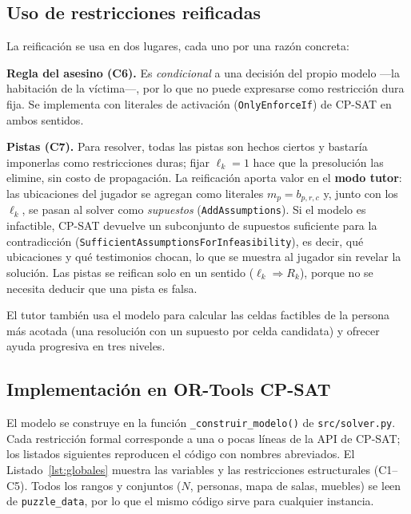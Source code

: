 \documentclass[conference,a4paper]{IEEEtran}
\begin{document}
\subsection{Uso de restricciones reificadas}\label{sec:reif}
La reificación se usa en dos lugares, cada uno por una razón concreta:

\textbf{Regla del asesino (C6).} Es \emph{condicional} a una decisión del propio modelo
---la habitación de la víctima---, por lo que no puede expresarse como restricción dura
fija. Se implementa con literales de activación (\texttt{OnlyEnforceIf}) de CP-SAT en
ambos sentidos.

\textbf{Pistas (C7).} Para resolver, todas las pistas son hechos ciertos y bastaría
imponerlas como restricciones duras; fijar $\ell_k=1$ hace que la presolución las elimine,
sin costo de propagación. La reificación aporta valor en el \textbf{modo tutor}: las
ubicaciones del jugador se agregan como literales $m_{p}=b_{p,r,c}$ y, junto con los
$\ell_k$, se pasan al solver como \emph{supuestos} (\texttt{AddAssumptions}). Si el
modelo es infactible, CP-SAT devuelve un subconjunto de supuestos suficiente para la
contradicción (\texttt{SufficientAssumptionsForInfeasibility}), es decir, qué
ubicaciones y qué testimonios chocan, lo que se muestra al jugador sin revelar la solución.
Las pistas se reifican solo en un sentido ($\ell_k\Rightarrow R_k$), porque no se necesita
deducir que una pista es falsa.

El tutor también usa el modelo para calcular las celdas factibles de la persona más
acotada (una resolución con un supuesto por celda candidata) y ofrecer ayuda progresiva en
tres niveles.

\subsection{Implementación en OR-Tools CP-SAT}\label{sec:codigo}
El modelo se construye en la función \texttt{\_construir\_modelo()} de
\texttt{src/solver.py}. Cada restricción formal corresponde a una o pocas líneas de la API
de CP-SAT; los listados siguientes reproducen el código con nombres abreviados.
El Listado~\ref{lst:globales} muestra las variables y las restricciones estructurales
(C1--C5). Todos los rangos y conjuntos ($N$, personas, mapa de salas, muebles) se leen de
\texttt{puzzle\_data}, por lo que el mismo código sirve para cualquier instancia.
\end{document}
